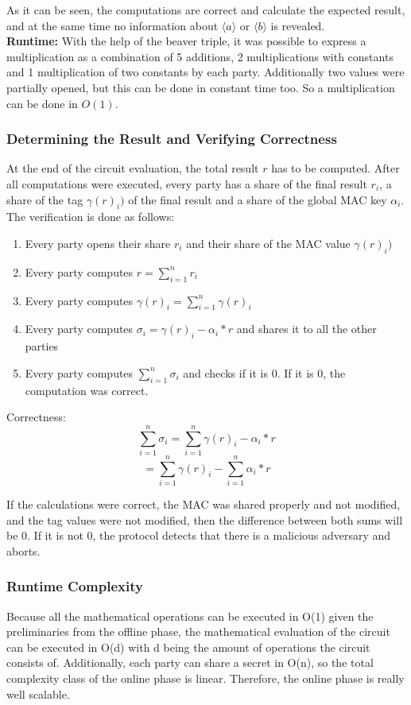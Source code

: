 \documentclass[english,runningheads,a4paper]{llncs}[2018/03/10]
\begin{document}
As it can be seen, the computations are correct and calculate the expected result, and at the same time no information about \(\langle a \rangle \) or \(\langle b \rangle \) is revealed.\\

\textbf{Runtime:} With the help of the beaver triple, it was possible to express a multiplication as a combination of 5 additions, 2 multiplications with constants and 1 multiplication of two constants by each party. Additionally two values were partially opened, but this can be done in constant time too. So a multiplication can be done in \(O(1)\).\\

\subsubsection{Determining the Result and Verifying Correctness}
At the end of the circuit evaluation, the total result $r$ has to be computed. After all computations were executed, every party has a share of the final result \( r_i\), a share of the tag \( \gamma(r)_i)\) of the final result and a share of the global MAC key \( \alpha_i \). The verification is done as follows:

\begin{enumerate}
\item Every party  opens their share \( r_i\) and their share of the MAC value \( \gamma(r)_i) \)
\item Every party computes \( r = \sum_{i=1}^n r_i \) 
\item Every party computes  \( \gamma(r)_i = \sum_{i=1}^n \gamma(r)_i \)
\item Every party computes  \( \sigma_i =  \gamma(r)_i - \alpha_i * r\) and shares it to all the other parties
\item Every party computes \( \sum_{i=1}^n \sigma_i \) and checks if it is \(0\). If it is  \(0\), the computation was correct.
\end{enumerate}
Correctness: 
$$ \sum_{i=1}^n \sigma_i =  \sum_{i=1}^n  \gamma(r)_i - \alpha_i * r $$
$$=  \sum_{i=1}^n  \gamma(r)_i -  \sum_{i=1}^n  \alpha_i * r $$

If the calculations were correct, the MAC was shared properly and not modified, and the tag values were not modified, then the difference between both sums will be 0. If it is not 0, the protocol detects that there is a malicious adversary and aborts.\\

\subsubsection{Runtime Complexity}
Because all the mathematical operations can be executed in O(1) given the preliminaries from the offline phase, the mathematical evaluation of the circuit can be executed in O(d) with d being the amount of operations the circuit consists of. Additionally, each party can share a secret in O(n), so the total complexity class of the online phase is linear. Therefore, the online phase is really well scalable.\\
\end{document}
